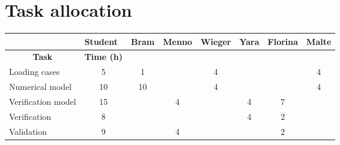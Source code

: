 \section{Task allocation}
\begin{center}
    

\begin{table}[H]
\centering
\begin{tabular}{l|c|c|c|c|c|c|c|}

\cline{2-8}
\textbf{}                                  & \multicolumn{1}{l|}{\textbf{Student}} & \multicolumn{1}{l|}{Bram} & \multicolumn{1}{l|}{Menno} & \multicolumn{1}{l|}{Wieger} & \multicolumn{1}{l|}{Yara} & \multicolumn{1}{l|}{Florina} & \multicolumn{1}{l|}{Malte} \\ \hline
\multicolumn{1}{|c|}{\textbf{Task}}        & \textbf{Time (h)}                     &                           &                            &                             &                           &                              &                            \\ \hline
\multicolumn{1}{|l|}{Loading cases}        & 5                                     &   1                        &                            & 4                           &                           &                              & 4                          \\ \hline
\multicolumn{1}{|l|}{Numerical model}      & 10                                    & 10                         &                            & 4                           &                           &                              & 4                          \\ \hline
\multicolumn{1}{|l|}{Verification model}   & 15                                    &                           & 4                          &                             & 4                         & 7                            &                            \\ \hline
\multicolumn{1}{|l|}{Verification}         & 8                                     &                           &                            &                             & 4                         & 2                            &                            \\ \hline
\multicolumn{1}{|l|}{Validation}           & 9                                     &                           & 4                          &                             &                           & 2                            &                            \\ \hline

\end{tabular}
\end{table}
\end{center}
